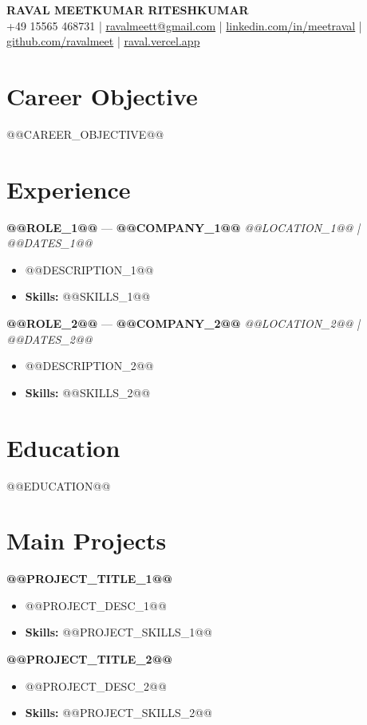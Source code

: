 \documentclass[a4paper,10pt]{article}
\begin{document}
\begin{center}
  {\Large\bfseries RAVAL MEETKUMAR RITESHKUMAR}\\[2pt]
  {\small +49 15565 468731 \;|\; \href{mailto:ravalmeett@gmail.com}{ravalmeett@gmail.com} \;|\; \href{https://www.linkedin.com/in/meetraval/}{linkedin.com/in/meetraval} \;|\; \href{https://github.com/ravalmeet}{github.com/ravalmeet} \;|\; \href{https://raval.vercel.app/}{raval.vercel.app}}
\end{center}
\vspace{-3pt}

\section*{Career Objective}
@@CAREER_OBJECTIVE@@\par

\section*{Experience}
\textbf{@@ROLE_1@@} — \textbf{@@COMPANY_1@@} \hfill \textit{@@LOCATION_1@@ \;|\; @@DATES_1@@}\par
\vspace{1pt}
\begin{itemize}
  \item @@DESCRIPTION_1@@
  \item \textbf{Skills:} @@SKILLS_1@@
\end{itemize}
\vspace{3pt}
\textbf{@@ROLE_2@@} — \textbf{@@COMPANY_2@@} \hfill \textit{@@LOCATION_2@@ \;|\; @@DATES_2@@}\par
\vspace{1pt}
\begin{itemize}
  \item @@DESCRIPTION_2@@
  \item \textbf{Skills:} @@SKILLS_2@@
\end{itemize}

\section*{Education}
@@EDUCATION@@\par

\section*{Main Projects}
\textbf{@@PROJECT_TITLE_1@@}\par
\vspace{1pt}
\begin{itemize}
  \item @@PROJECT_DESC_1@@
  \item \textbf{Skills:} @@PROJECT_SKILLS_1@@
\end{itemize}
\vspace{3pt}
\textbf{@@PROJECT_TITLE_2@@}\par
\vspace{1pt}
\begin{itemize}
  \item @@PROJECT_DESC_2@@
  \item \textbf{Skills:} @@PROJECT_SKILLS_2@@
\end{itemize}
\end{document}
